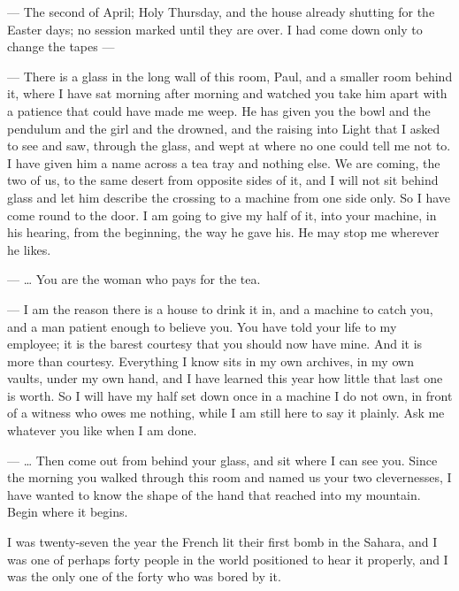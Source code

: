 
\begin{room}

--- The second of April; Holy Thursday, and the house already shutting for the Easter days; no session marked until they are over. I had come down only to change the tapes ---

--- There is a glass in the long wall of this room, Paul, and a smaller room behind it, where I have sat morning after morning and watched you take him apart with a patience that could have made me weep. He has given you the bowl and the pendulum and the girl and the drowned, and the raising into Light that I asked to see and saw, through the glass, and wept at where no one could tell me not to. I have given him a name across a tea tray and nothing else. We are coming, the two of us, to the same desert from opposite sides of it, and I will not sit behind glass and let him describe the crossing to a machine from one side only. So I have come round to the door. I am going to give my half of it, into your machine, in his hearing, from the beginning, the way he gave his. He may stop me wherever he likes.

--- \ldots{} You are the woman who pays for the tea.

--- I am the reason there is a house to drink it in, and a machine to catch you, and a man patient enough to believe you. You have told your life to my employee; it is the barest courtesy that you should now have mine. And it is more than courtesy. Everything I know sits in my own archives, in my own vaults, under my own hand, and I have learned this year how little that last one is worth. So I will have my half set down once in a machine I do not own, in front of a witness who owes me nothing, while I am still here to say it plainly. Ask me whatever you like when I am done.

--- \ldots{} Then come out from behind your glass, and sit where I can see you. Since the morning you walked through this room and named us your two clevernesses, I have wanted to know the shape of the hand that reached into my mountain. Begin where it begins.

\end{room}

I was twenty-seven the year the French lit their first bomb in the Sahara, and I was one of perhaps forty people in the world positioned to hear it properly, and I was the only one of the forty who was bored by it.\par

